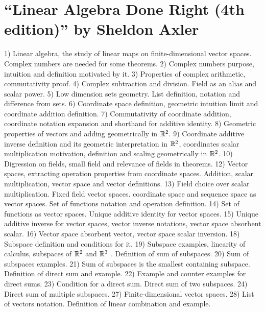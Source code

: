 

\usepackage[english]{babel}



\section*{``Linear Algebra Done Right (4th edition)'' by Sheldon Axler}
\begin{multicols}{3}
  1) Linear algebra, the study of linear maps on finite-dimensional vector
  spaces. Complex numbers are needed for some theorems.
  2) Complex numbers purpose, intuition and definition motivated by it.
  3) Properties of complex arithmetic, commutativity proof.
  4) Complex subtraction and division. Field as an alias and scalar power.
  5) Low dimension sets geometry. List definition, notation and difference from
  sets.
  6) Coordinate space definition, geometric intuition limit and coordinate
  addition definition.
  7) Commutativity of coordinate addition, coordinate notation expansion and
  shorthand for additive identity.
  8) Geometric properties of vectors and adding geometrically in $\mathbb{R}^2$.
  9) Coordinate additive inverse definition and its geometric interpretation in
  $\mathbb{R}^2$, coordinates scalar multiplication motivation, definition and
  scaling geometrically in $\mathbb{R}^2$.
  10) Digression on fields, small field and relevance of fields in theorems.
  12) Vector spaces, extracting operation properties from coordinate spaces.
  Addition, scalar multiplication, vector space and vector definitions.
  13) Field choice over scalar multiplication. Fixed field vector spaces.
  coordinate space and sequence space as vector spaces. Set of functions notation
  and operation definition.
  14) Set of functions as vector spaces. Unique additive identity for vector
  spaces.
  15) Unique additive inverse for vector spaces, vector inverse notations,
  vector space absorbent scalar.
  16) Vector space absorbent vector, vector space scalar inversion.
  18) Subspace definition and conditions for it.
  19) Subspace examples, linearity of calculus, subspaces of $\mathbb{R}^2$ and
  $\mathbb{R}^3$ . Definition of sum of subspaces.
  20) Sum of subspaces examples.
  21) Sum of subspaces is the smallest containing subspace. Definition of direct
  sum and example.
  22) Example and counter examples for direct sums.
  23) Condition for a direct sum. Direct sum of two subspaces.
  24) Direct sum of multiple subspaces.
  27) Finite-dimensional vector spaces.
  28) List of vectors notation. Definition of linear combination and example.

\end{multicols}
